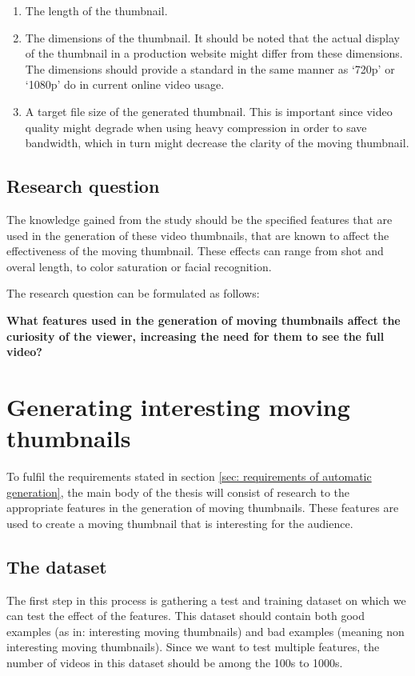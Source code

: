 \documentclass{../resources/acm_proc_article-sp}
\begin{document}
\begin{enumerate}
	\item The length of the thumbnail.
	\item The dimensions of the thumbnail. It should be noted that the actual display of the thumbnail in a production website might differ from these dimensions. The dimensions should provide a standard in the same manner as `720p' or `1080p' do in current online video usage.
	\item A target file size of the generated thumbnail. This is important since video quality might degrade when using heavy compression in order to save bandwidth, which in turn might decrease the clarity of the moving thumbnail.
\end{enumerate}

\subsection{Research question}

The knowledge gained from the study should be the specified features that are used in the generation of these video thumbnails, that are known to affect the effectiveness of the moving thumbnail. These effects can range from shot and overal length, to color saturation or facial recognition.

The research question can be formulated as follows:

\textbf{What features used in the generation of moving thumbnails affect the curiosity of the viewer, increasing the need for them to see the full video?}

\section{Generating interesting moving thumbnails}

To fulfil the requirements stated in section \ref{sec: requirements of automatic generation}, the main body of the thesis will consist of research to the appropriate features in the generation of moving thumbnails. These features are used to create a moving thumbnail that is interesting for the audience.

\subsection{The dataset}

The first step in this process is gathering a test and training dataset on which we can test the effect of the features. This dataset should contain both good examples (as in: interesting moving thumbnails) and bad examples (meaning non interesting moving thumbnails). Since we want to test multiple features, the number of videos in this dataset should be among the 100s to 1000s.
\end{document}
